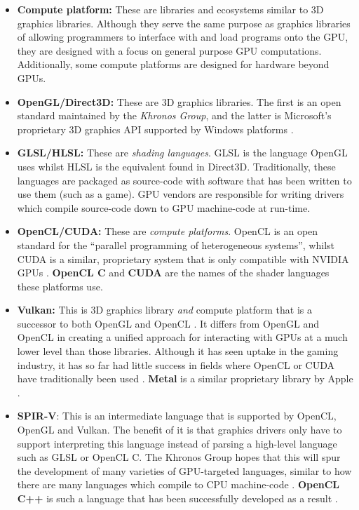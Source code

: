 \documentclass[a4paper,12pt,twoside,openright]{report}
\begin{document}
\begin{itemize}
    \item \textbf{Compute platform:} These are libraries and ecosystems similar
    to 3D graphics libraries. Although they serve the same purpose as graphics
    libraries of allowing programmers to interface with and load programs onto
    the GPU, they are designed with a focus on general purpose GPU
    computations. Additionally, some compute platforms are designed for
    hardware beyond GPUs.

    \item \textbf{OpenGL/Direct3D:} These are 3D graphics libraries. The first
    is an open standard maintained by the \textit{Khronos Group}, and the
    latter is Microsoft's proprietary 3D graphics API supported by Windows
    platforms \cite{OpenGL} \cite{Direct3D}.

    \item \textbf{GLSL/HLSL:} These are \textit{shading languages}. GLSL is the
    language OpenGL uses whilst HLSL is the equivalent found in Direct3D.
    Traditionally, these languages are packaged as source-code with software
    that has been written to use them (such as a game). GPU vendors are
    responsible for writing drivers which compile source-code down to GPU
    machine-code at run-time.

    \item \textbf{OpenCL/CUDA:} These are \textit{compute platforms}. OpenCL is
    an open standard for the ``parallel programming of heterogeneous systems'',
    whilst CUDA is a similar, proprietary system that is only compatible with
    NVIDIA GPUs \cite{OpenCL} \cite{CUDA}. \textbf{OpenCL C} and \textbf{CUDA}
    are the names of the shader languages these platforms use.

    \item \textbf{Vulkan:} This is 3D graphics library \textit{and} compute
    platform that is a successor to both OpenGL and OpenCL \cite{Vulkan}. It
    differs from OpenGL and OpenCL in creating a unified approach for
    interacting with GPUs at a much lower level than those libraries. Although
    it has seen uptake in the gaming industry, it has so far had little success
    in fields where OpenCL or CUDA have traditionally been used \cite{TODO}
    \cite{TODO}. \textbf{Metal} is a similar proprietary library by Apple
    \cite{Metal}.

    \item \textbf{SPIR-V}: This is an intermediate language that is supported
    by OpenCL, OpenGL and Vulkan. The benefit of it is that graphics drivers
    only have to support interpreting this language instead of parsing a
    high-level language such as GLSL or OpenCL C. The Khronos Group hopes that
    this will spur the development of many varieties of GPU-targeted languages,
    similar to how there are many languages which compile to CPU machine-code
    \cite{SPIRV}. \textbf{OpenCL C++} is such a language that has been
    successfully developed as a result \cite{OpenCLCPPWhitePaper}.


\end{itemize}
\end{document}

